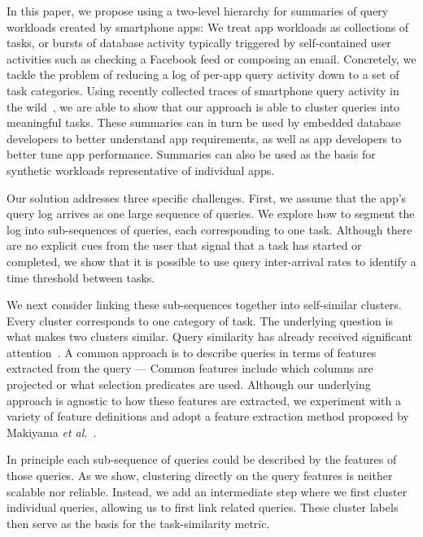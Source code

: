 In this paper, we propose using a two-level hierarchy for summaries of query workloads created by smartphone apps:
We treat app workloads as collections of tasks, or bursts of database activity typically triggered by self-contained user activities such as checking a Facebook feed or composing an email.
Concretely, we tackle the problem of reducing a log of per-app query activity down to a set of task categories.
Using recently collected traces of smartphone query activity in the wild~\cite{kennedy2015pocket}, we are able to show that our approach is able to cluster queries into meaningful tasks.
These summaries can in turn be used by embedded database developers to better understand app requirements, as well as app developers to better tune app performance.
Summaries can also be used as the basis for synthetic workloads representative of individual apps.

Our solution addresses three specific challenges.
First, we assume that the app's query log arrives as one large sequence of queries.  
We explore how to segment the log into sub-sequences of queries, each corresponding to one task.
Although there are no explicit cues from the user that signal that a task has started or completed, we show that it is possible to use query inter-arrival rates to identify a time threshold between tasks.

We next consider linking these sub-sequences together into self-similar clusters.  
Every cluster corresponds to one category of task.
The underlying question is what makes two clusters similar.
Query similarity has already received significant attention~\cite{aouiche2006,aligon2014similarity,makiyama2015text}.
A common approach is to describe queries in terms of features extracted from the query --- Common features include which columns are projected or what selection predicates are used.
Although our underlying approach is agnostic to how these features are extracted, we experiment with a variety of feature definitions and adopt a feature extraction method proposed by Makiyama \textit{et al.}~\cite{makiyama2015text}.

In principle each sub-sequence of queries could be described by the features of those queries.
As we show, clustering directly on the query features is neither scalable nor reliable.
Instead, we add an intermediate step where we first cluster individual queries, allowing us to first link related queries.
These cluster labels then serve as the basis for the task-similarity metric.



